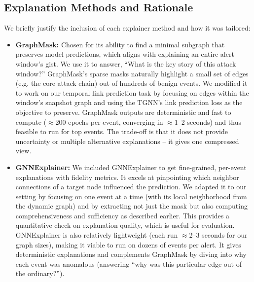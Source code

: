 \documentclass[conference]{IEEEtran}
\begin{document}
\subsection{Explanation Methods and Rationale}
We briefly justify the inclusion of each explainer method and how it was tailored:

\begin{itemize}
    \item \textbf{GraphMask:} Chosen for its ability to find a minimal subgraph that preserves model predictions, which aligns with explaining an entire alert window's gist. We use it to answer, ``What is the key story of this attack window?'' GraphMask's sparse masks naturally highlight a small set of edges (e.g. the core attack chain) out of hundreds of benign events. We modified it to work on our temporal link prediction task by focusing on edges within the window's snapshot graph and using the TGNN's link prediction loss as the objective to preserve. GraphMask outputs are deterministic and fast to compute ($\approx$200 epochs per event, converging in $\approx$1--2 seconds) and thus feasible to run for top events. The trade-off is that it does not provide uncertainty or multiple alternative explanations -- it gives one compressed view.
    \item \textbf{GNNExplainer:} We included GNNExplainer to get fine-grained, per-event explanations with fidelity metrics. It excels at pinpointing which neighbor connections of a target node influenced the prediction. We adapted it to our setting by focusing on one event at a time (with its local neighborhood from the dynamic graph) and by extracting not just the mask but also computing comprehensiveness and sufficiency as described earlier. This provides a quantitative check on explanation quality, which is useful for evaluation. GNNExplainer is also relatively lightweight (each run $\approx$2--3 seconds for our graph sizes), making it viable to run on dozens of events per alert. It gives deterministic explanations and complements GraphMask by diving into why each event was anomalous (answering ``why was this particular edge out of the ordinary?'').

\end{itemize}
\end{document}
